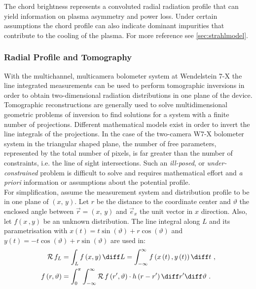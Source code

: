%
                The chord brightness represents a convoluted radial radiation profile that can yield information on plasma asymmetry and power loss. Under certain assumptions the chord profile can also indicate dominant impurities that contribute to the cooling of the plasma. For more reference see \cref{sec:strahlmodel}.
%
            \subsubsection*{Radial Profile and Tomography}%
%
                With the multichannel, multicamera bolometer system at Wendelstein 7-X the line integrated measurements can be used to perform tomographic inversions in order to obtain two-dimensional radiation distributions in one plane of the device. Tomographic reconstructions are generally used to solve multidimensional geometric problems of inversion to find solutions for a system with a finite number of projections. Different mathematical models exist in order to invert the line integrals of the projections. In the case of the two-camera W7-X bolometer system in the triangular shaped plane, the number of free parameters, represented by the total number of pixels, is far greater than the number of constraints, i.e. the line of sight intersections. Such an \textit{ill-posed}, or \textit{under-constrained} problem is difficult to solve and requires mathematical effort and \textit{a priori} information or assumptions about the potential profile.\\%
                For simplification, assume the measurement system and distribution profile to be in one plane of $\left(x,\,y\right)$. Let $r$ be the distance to the coordinate center and $\vartheta$ the enclosed angle between $\vec{r}=\left(x,\,y\right)$ and $\vec{e}_{x}$ the unit vector in $x$ direction. Also, let $f\left(x\,,y\right)$ be an unknown distribution. The line integral along $L$ and its parametrisation with $x\left(t\right)=t\sin\left(\vartheta\right)+r\cos\left(\vartheta\right)$ and $y\left(t\right)=-t\cos\left(\vartheta\right)+r\sin\left(\vartheta\right)$ are used in:%
%
                \begin{align}%
                    \begin{split}\label{eq:radon_transform}%
                        \mathcal{R}\,f_{L}&=\int_{L}f\left(x,y\right)\diff L=\int_{-\infty}^{\infty}f\left(x\left(t\right),y\left(t\right)\right)\diff t\,\,,\\%
                        f\left(r,\vartheta\right)&=\int_{0}^{\pi}\int_{-\infty}^{\infty}\mathcal{R}\,f\left(r^{\prime},\vartheta\right)\cdot h\left(r-r^{\prime}\right)\diff r^{\prime}\diff\vartheta\,\,.%
                    \end{split}%
                \end{align}%
